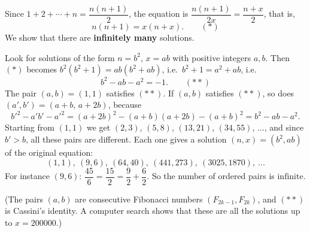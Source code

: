 Since $1+2+\cdots+n=\dfrac{n(n+1)}{2}$, the equation is $\dfrac{n(n+1)}{2x}=\dfrac{n+x}{2}$, that is,
\[
n(n+1)=x(n+x). \qquad (*)
\]
We show that there are \textbf{infinitely many} solutions.

Look for solutions of the form $n=b^2$, $x=ab$ with positive integers $a,b$. Then $(*)$ becomes $b^2(b^2+1)=ab(b^2+ab)$, i.e.\ $b^2+1=a^2+ab$, i.e.
\[
b^2-ab-a^2=-1 . \qquad (**)
\]
The pair $(a,b)=(1,1)$ satisfies $(**)$. If $(a,b)$ satisfies $(**)$, so does $(a',b')=(a+b,\,a+2b)$, because
\[
b'^2-a'b'-a'^2=(a+2b)^2-(a+b)(a+2b)-(a+b)^2=b^2-ab-a^2 .
\]
Starting from $(1,1)$ we get $(2,3)$, $(5,8)$, $(13,21)$, $(34,55)$, $\dots$, and since $b'>b$, all these pairs are different. Each one gives a solution $(n,x)=(b^2,ab)$ of the original equation:
\[
(1,1),\ (9,6),\ (64,40),\ (441,273),\ (3025,1870),\ \dots
\]
For instance $(9,6)$: $\dfrac{45}{6}=\dfrac{15}{2}=\dfrac{9}{2}+\dfrac{6}{2}$. So the number of ordered pairs is $\boxed{\text{infinite}}$.

(The pairs $(a,b)$ are consecutive Fibonacci numbers $(F_{2k-1},F_{2k})$, and $(**)$ is Cassini's identity. A computer search shows that these are all the solutions up to $x=200000$.)
